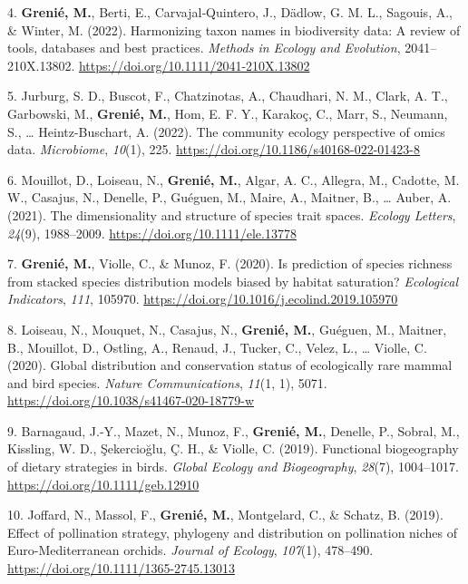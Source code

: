 \documentclass[10pt,a4paper,]{article}
\begin{document}
\leavevmode{}%
4. \textbf{Grenié, M.}, Berti, E., Carvajal‐Quintero, J., Dädlow, G. M.
L., Sagouis, A., \& Winter, M. (2022). Harmonizing taxon names in
biodiversity data: A review of tools, databases and best practices.
\emph{Methods in Ecology and Evolution}, 2041--210X.13802.
\url{https://doi.org/10.1111/2041-210X.13802}

\leavevmode{}%
5. Jurburg, S. D., Buscot, F., Chatzinotas, A., Chaudhari, N. M., Clark,
A. T., Garbowski, M., \textbf{Grenié, M.}, Hom, E. F. Y., Karakoç, C.,
Marr, S., Neumann, S., \ldots{} Heintz-Buschart, A. (2022). The
community ecology perspective of omics data. \emph{Microbiome},
\emph{10}(1), 225. \url{https://doi.org/10.1186/s40168-022-01423-8}

\leavevmode{}%
6. Mouillot, D., Loiseau, N., \textbf{Grenié, M.}, Algar, A. C.,
Allegra, M., Cadotte, M. W., Casajus, N., Denelle, P., Guéguen, M.,
Maire, A., Maitner, B., \ldots{} Auber, A. (2021). The dimensionality
and structure of species trait spaces. \emph{Ecology Letters},
\emph{24}(9), 1988--2009. \url{https://doi.org/10.1111/ele.13778}

\leavevmode{}%
7. \textbf{Grenié, M.}, Violle, C., \& Munoz, F. (2020). Is prediction
of species richness from stacked species distribution models biased by
habitat saturation? \emph{Ecological Indicators}, \emph{111}, 105970.
\url{https://doi.org/10.1016/j.ecolind.2019.105970}

\leavevmode{}%
8. Loiseau, N., Mouquet, N., Casajus, N., \textbf{Grenié, M.}, Guéguen,
M., Maitner, B., Mouillot, D., Ostling, A., Renaud, J., Tucker, C.,
Velez, L., \ldots{} Violle, C. (2020). Global distribution and
conservation status of ecologically rare mammal and bird species.
\emph{Nature Communications}, \emph{11}(1, 1), 5071.
\url{https://doi.org/10.1038/s41467-020-18779-w}

\leavevmode{}%
9. Barnagaud, J.-Y., Mazet, N., Munoz, F., \textbf{Grenié, M.}, Denelle,
P., Sobral, M., Kissling, W. D., Şekercioğlu, Ç. H., \& Violle, C.
(2019). Functional biogeography of dietary strategies in birds.
\emph{Global Ecology and Biogeography}, \emph{28}(7), 1004--1017.
\url{https://doi.org/10.1111/geb.12910}

\leavevmode{}%
10. Joffard, N., Massol, F., \textbf{Grenié, M.}, Montgelard, C., \&
Schatz, B. (2019). Effect of pollination strategy, phylogeny and
distribution on pollination niches of Euro-Mediterranean orchids.
\emph{Journal of Ecology}, \emph{107}(1), 478--490.
\url{https://doi.org/10.1111/1365-2745.13013}
\end{document}

